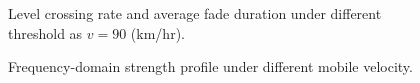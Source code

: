 \documentclass[12pt, draftclsnofoot, onecolumn]{IEEEtran}
\begin{document}
\begin{figure}[t!]
\centering
{}
\caption{Level crossing rate and average fade duration under different threshold as $v = 90$ (km/hr).}\label{fig:level crossing90}
\end{figure}


\begin{figure}[t]
\centering
{}
\caption{Frequency-domain strength profile under different mobile velocity.}\label{fig:strength_freq}
\end{figure}
\end{document}
